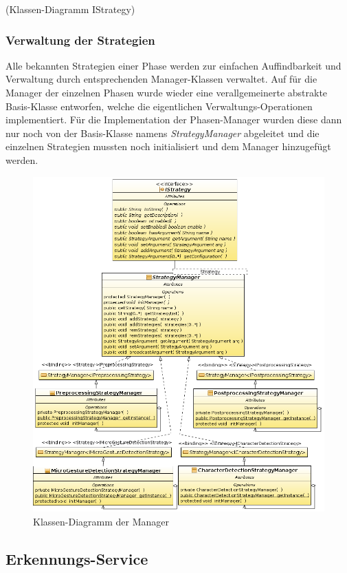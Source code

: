 (Klassen-Diagramm IStrategy)

\subsubsection{Verwaltung der Strategien}

Alle bekannten Strategien einer Phase werden zur einfachen Auffindbarkeit und Verwaltung durch entsprechenden Manager-Klassen verwaltet. Auf für die Manager der einzelnen Phasen wurde wieder eine verallgemeinerte abstrakte Basis-Klasse entworfen, welche die eigentlichen Verwaltungs-Operationen implementiert. Für die Implementation der Phasen-Manager wurden diese dann nur noch von der Basis-Klasse namens \emph{StrategyManager} abgeleitet und die einzelnen Strategien mussten noch initialisiert und dem Manager hinzugefügt werden.

\begin{figure}[h]
   \centering
   \includegraphics[width=\textwidth]{img/uml_cd_manager} 
   \caption{Klassen-Diagramm der Manager}
   \label{fig:cl_manager}
\end{figure}

\subsection{Erkennungs-Service}

